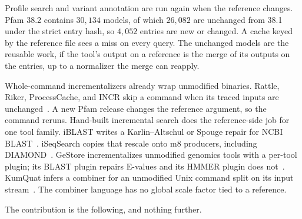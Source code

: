 \documentclass[letterpaper,twocolumn,10pt]{article}
\begin{document}
Profile search and variant annotation are run again when the reference changes.
Pfam 38.2 contains
$30{,}134$
models, of which
$26{,}082$
are unchanged from 38.1 under the strict entry hash, so
$4{,}052$
entries are new or changed.
A cache keyed by the reference file sees a miss on every query.
The unchanged models are the reusable work, if the tool's output on a reference is the merge of its outputs on the entries, up to a normalizer the merge can reapply.

Whole-command incrementalizers already wrap unmodified binaries.
Rattle, Riker, ProcessCache, and INCR skip a command when its traced inputs are unchanged~\cite{spall2020rattle,curtsinger2022riker,shiptoski2023processcache,xie2026incr}.
A new Pfam release changes the reference argument, so the command reruns.
Hand-built incremental search does the reference-side job for one tool family.
iBLAST writes a Karlin--Altschul or Spouge repair for NCBI BLAST~\cite{dash2021iblast,karlin1990significance}.
iSeqSearch copies that rescale onto m8 producers, including DIAMOND~\cite{yoo2025iseqsearch}.
GeStore incrementalizes unmodified genomics tools with a per-tool plugin; its BLAST plugin repairs E-values and its HMMER plugin does not~\cite{pedersen2014gestore}.
KumQuat infers a combiner for an unmodified Unix command split on its input stream~\cite{shen2022kumquat}.
The combiner language has no global scale factor tied to a reference.

The contribution is the following, and nothing further.
\end{document}
